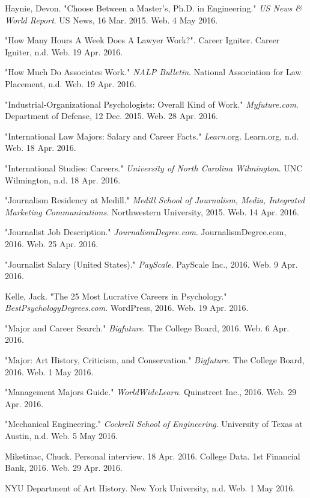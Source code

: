 \begin{workscited}
\begin{flushleft}
\bibent
Haynie, Devon. "Choose Between a Master’s, Ph.D. in Engineering." \textit{US News \& World Report}. US News, 16 Mar. 2015. Web. 4 May 2016. 	

\bibent
"How Many Hours A Week Does A Lawyer Work?". Career Igniter. Career Igniter, n.d. Web. 19 
Apr. 2016. 

\bibent
"How Much Do Associates Work." \textit{NALP Bulletin}. National Association for Law Placement, n.d. 
Web. 19 Apr. 2016. 

\bibent 
"Industrial-Organizational Psychologists: Overall Kind of Work." \textit{Myfuture.com}. Department of 		Defense, 12 Dec. 2015. Web. 28 Apr. 2016. 

\bibent
"International Law Majors: Salary and Career Facts." \textit{Learn}.org. Learn.org, n.d. Web. 18 Apr. 
2016. 

\bibent
"International Studies: Careers." \textit{University of North Carolina Wilmington}. UNC Wilmington, 
n.d. 18 Apr. 2016. 

\bibent
"Journalism Residency at Medill." \textit{Medill School of Journalism, Media, Integrated Marketing 	
Communications}. Northwestern University, 2015. Web. 14 Apr. 2016. 

\bibent
"Journalist Job Description." \textit{JournalismDegree.com}. JournalismDegree.com, 2016. Web. 25 
Apr. 2016.

\bibent
"Journalist Salary (United States)." \textit{PayScale}. PayScale Inc., 2016. Web. 9 Apr. 2016.

\bibent
Kelle, Jack. "The 25 Most Lucrative Careers in Psychology." \textit{BestPsychologyDegrees.com}.		 WordPress, 2016. Web. 19 Apr. 2016. 

\bibent
"Major and Career Search." \textit{Bigfuture}. The College Board, 2016. Web. 6 Apr. 2016. 

\bibent
"Major: Art History, Criticism, and Conservation." \textit{Bigfuture}. The College Board, 2016. Web. 1 
May 2016.

\bibent
"Management Majors Guide." \textit{WorldWideLearn}. Quinstreet Inc., 2016. Web. 29 Apr. 2016.

\bibent
"Mechanical Engineering." \textit{Cockrell School of Engineering}. University of Texas at Austin, n.d. Web. 5 May 2016.

\bibent
Miketinac, Chuck. Personal interview. 18 Apr. 2016.
College Data. 1st Financial Bank, 2016. Web. 29 Apr. 2016. 

\bibent
NYU Department of Art History. New York University, n.d. Web. 1 May 2016.


\end{flushleft}
\end{workscited}
